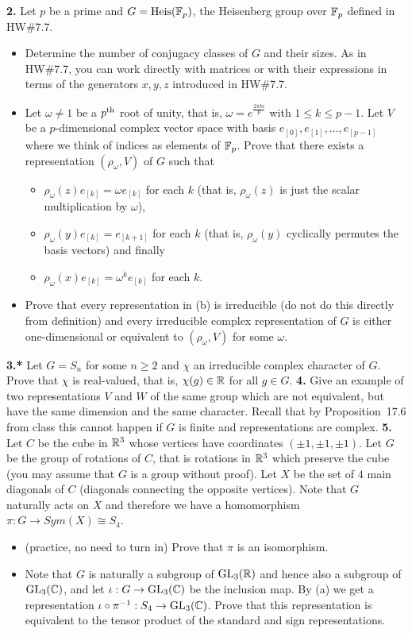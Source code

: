 \documentclass[11pt]{amsart}
\begin{document}
\skv
{\bf 2.} Let $p$ be a prime and $G={\rm Heis}({\mathbb F}_p)$, the Heisenberg group over ${\mathbb F}_p$ defined in HW\#7.7.
\begin{itemize}
\item[(a)] Determine the number of conjugacy classes of $G$ and their sizes. As in HW\#7.7, you can work directly with matrices or 
with their expressions in terms of the generators $x,y,z$ introduced in HW\#7.7.
\item[(b)] Let $\omega\neq 1$ be a $p^{\rm th}$ root of unity, that is, $\omega=e^{\frac{2\pi k i}{p}}$ with $1\leq k\leq p-1$.
Let $V$ be a $p$-dimensional complex vector space with basis $e_{[0]}, e_{[1]},\ldots, e_{[p-1]}$ where we think of indices as elements of ${\mathbb F}_p$.
Prove that there exists a representation $(\rho_{\omega},V)$ of $G$ such that
\begin{itemize}
\item $\rho_{\omega}(z) e_{[k]}=\omega e_{[k]}$ for each $k$ (that is, $\rho_{\omega}(z)$ is just the scalar multiplication by $\omega$),
\item $\rho_{\omega}(y) e_{[k]}=e_{[k+1]}$ for each $k$ (that is, $\rho_{\omega}(y)$ cyclically permutes the basis vectors) and finally 
\item $\rho_{\omega}(x) e_{[k]}=\omega^{k} e_{[k]}$ for each $k$.
\end{itemize}
\item[(c)] Prove that every representation in (b) is irreducible (do not do this directly from definition) and every irreducible complex representation of $G$ is either one-dimensional 
or equivalent to $(\rho_{\omega},V)$ for some $\omega$.
\end{itemize}
\skv
{\bf 3.*} Let $G=S_n$ for some $n\geq 2$ and $\chi$ an irreducible complex character of $G$. Prove that $\chi$ is real-valued, that is,
$\chi(g)\in {\mathbb R}$ for all $g\in G$. 
\skv
{\bf 4.} Give an example of two representations $V$ and $W$ of the same group which are not equivalent, but have the same dimension and the same character. Recall that by Proposition~17.6 from class this cannot happen if $G$ is finite and representations are complex.
\skv
{\bf 5.} Let $C$ be the cube in ${\mathbb R}^3$ whose vertices have coordinates 
$(\pm 1, \pm 1,\pm 1)$. Let $G$ be the group of rotations of $C$, that is rotations in ${\mathbb R}^3$ which preserve the cube (you may assume that $G$ is a group without proof). Let $X$ be the set of $4$ main diagonals of $C$ (diagonals
connecting the opposite vertices). Note that $G$ naturally acts on $X$ and therefore we have a homomorphism $\pi:G\to Sym(X)\cong S_4$.
\begin{itemize}
\item[(a)] (practice, no need to turn in) Prove that $\pi$ is an isomorphism.
\item[(b)] Note that $G$ is naturally a subgroup of ${\rm GL}_3({\mathbb R})$ and hence
also a subgroup of ${\rm GL}_3({\mathbb C})$, and let $\iota: G\to {\rm GL}_3({\mathbb C})$
be the inclusion map. By (a) we get a representation $\iota\circ \pi^{-1}:
S_4\to{\rm GL}_3({\mathbb C})$. Prove that this representation is equivalent to the tensor product of the standard and sign representations.
\end{itemize}
\end{document}
